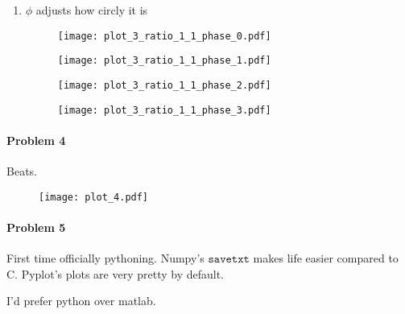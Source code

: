 \documentclass[12pt, oneside, letterpaper, fleqn]{article}
\begin{document}
\begin{enumerate}
\pagebreak
\item $\phi$ adjusts how circly it is
\begin{figure}[htbp]
\texttt{[image: plot\_3\_ratio\_1\_1\_phase\_0.pdf]}
\end{figure}
\begin{figure}[htbp]
\texttt{[image: plot\_3\_ratio\_1\_1\_phase\_1.pdf]}
\end{figure}
\begin{figure}[htbp]
\texttt{[image: plot\_3\_ratio\_1\_1\_phase\_2.pdf]}
\end{figure}
\begin{figure}[htbp]
\texttt{[image: plot\_3\_ratio\_1\_1\_phase\_3.pdf]}
\end{figure}
\end{enumerate}

\pagebreak
\paragraph{Problem 4}
Beats.
\begin{figure}[htbp]
\texttt{[image: plot\_4.pdf]}
\end{figure}

\paragraph{Problem 5}
First time officially pythoning. Numpy's $\texttt{savetxt}$ makes life
easier compared to C. Pyplot's plots are very pretty by default.

I'd prefer python over matlab.
\end{document}
